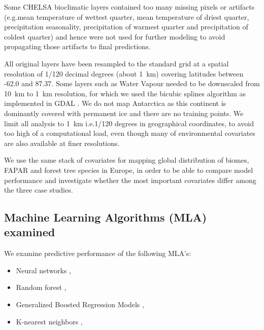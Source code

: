 \documentclass[fleqn,10pt,lineno]{wlpeerj} %
\begin{document}
Some CHELSA bioclimatic layers contained too many missing pixels or artifacts (e.g.\@ mean temperature of wettest quarter, mean temperature of driest quarter, precipitation seasonality, precipitation of warmest quarter and precipitation of coldest quarter) and hence were not used for further modeling to avoid propagating those artifacts to final predictions. \par 

All original layers have been resampled to the standard grid at a spatial resolution of 1/120 decimal degrees (about \SI{1}{\kilo\metre}) covering latitudes between -62.0 and 87.37. Some layers such as Water Vapour needed to be downscaled from \SI{10}{\kilo\metre} to \SI{1}{\kilo\metre} resolution, for which we used the bicubic splines algorithm as implemented in GDAL \citep{mitchell2014geospatial}. We do not map Antarctica as this continent is dominantly covered with permanent ice and there are no training points. We limit all analysis to \SI{1}{\kilo\metre} i.e.\@ 1/120 degrees in geographical coordinates, to avoid too high of a computational load, even though many of environmental covariates are also available at finer resolutions. \par 

We use the same stack of covariates for mapping global distribution of biomes, FAPAR and forest tree species in Europe, in order to be able to compare model performance and investigate whether the most important covariates differ among the three case studies.\par

\subsection*{Machine Learning Algorithms (MLA) examined}

We examine predictive performance of the following MLA's:

\begin{itemize}
\item Neural networks \citep{Venables2002Springer},
\item Random forest \citep{breiman2001random,cutler2007random,Biau2016,peerj.preprints.26693v1},
\item Generalized Boosted Regression Models \citep{friedman2002stochastic},
\item K-nearest neighbors \citep{Venables2002Springer},
\end{itemize}
\end{document}
